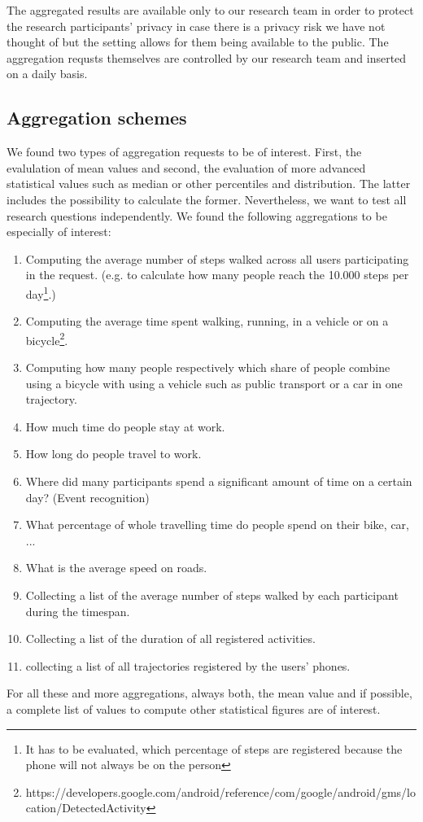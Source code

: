  The aggregated results are available only to our research team in order to protect the research participants' privacy in case there is a privacy risk we have not thought of but the setting allows for them being available to the public. The aggregation requsts themselves are controlled by our research team and inserted on a daily basis.

 \subsection{Aggregation schemes}\label{aggregation-schemes}
 We found two types of aggregation requests to be of interest. First, the evalulation of mean values and second, the evaluation of more advanced statistical values such as median or other percentiles and distribution. The latter includes the possibility to calculate the former. Nevertheless, we want to test all research questions independently.
 We found the following aggregations to be especially of interest:
 \begin{enumerate}
 	\item Computing the average number of steps walked across all users participating in the request. (e.g. to calculate how many people reach the 10.000 steps per day\footnote{It has to be evaluated, which percentage of steps are registered because the phone will not always be on the person}.)
	\item Computing the average time spent walking, running, in a vehicle or on a bicycle\footnote{https://developers.google.com/android/reference/com/google/android/gms/location/DetectedActivity}.
	\item Computing how many people respectively which share of people combine using a bicycle with using a vehicle such as public transport or a car in one trajectory.
	\item How much time do people stay at work.
	\item How long do people travel to work.
	\item Where did many participants spend a significant amount of time on a certain day? (Event recognition)
	\item What percentage of whole travelling time do people spend on their bike, car, ...
	\item What is the average speed on roads.

	\item Collecting a list of the average number of steps walked by each participant during the timespan.
	\item Collecting a list of the duration of all registered activities.

	\item collecting a list of all trajectories registered by the users' phones.
 \end{enumerate}
 For all these and more aggregations, always both, the mean value and if possible, a complete list of values to compute other statistical figures are of interest.

